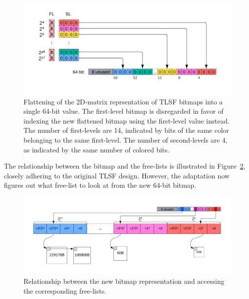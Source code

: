 \begin{figure}[H]
    \centering
    \includegraphics[width=1\textwidth]{figures/bitmap_flattening.png}
    \caption{Flattening of the 2D-matrix reprsentation of TLSF bitmaps into a single 64-bit value. The first-level bitmap is disregarded in favor of indexing the new flattened bitmap using the first-level value instead. The number of first-levels are 14, indicated by bits of the same color belonging to the same first-level. The number of second-levels are 4, as indicated by the same number of colored bits.}
    \label{fig:bitmap_flattening}
\end{figure}

The relationship between the bitmap and the free-lists is illustrated in Figure~\ref{fig:bitmap_relationship}, closely adhering to the original TLSF design. However, the adaptation now figures out what free-list to look at from the new 64-bit bitmap.

\begin{figure}[H]
    \centering
    \includegraphics[width=1\textwidth]{figures/bitmap_relationship.png}
    \caption{Relationship between the new bitmap representation and accessing the corresponding free-lists.}
    \label{fig:bitmap_relationship}
\end{figure}



